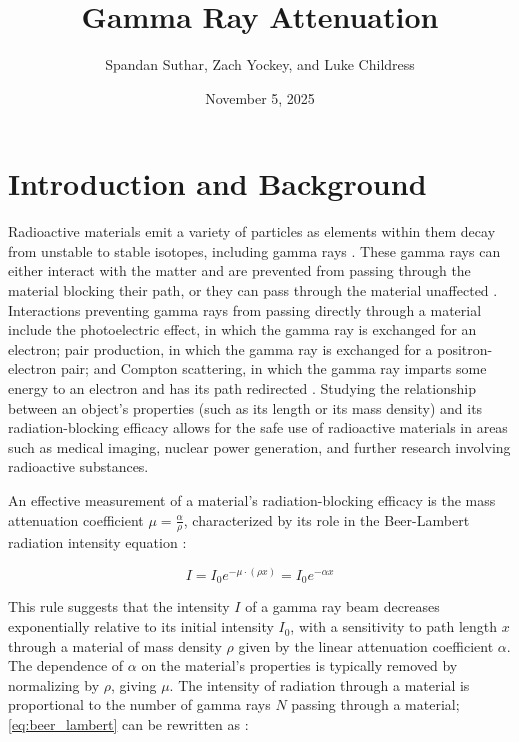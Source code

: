\documentclass[11pt]{article}
\title{Gamma Ray Attenuation}
\author{Spandan Suthar, Zach Yockey, and Luke Childress}
\date{November 5, 2025}
\begin{document}
\maketitle

\section{Introduction and Background}

Radioactive materials emit a variety of particles as elements within
them decay from unstable to stable isotopes, including gamma rays
\cite{nist-gen, young}. These
gamma rays can either interact with the matter and are prevented from passing
through the material blocking their path, or they can pass through the material
unaffected \cite{nist-gen}. Interactions preventing gamma rays from
passing directly
through a material include the photoelectric effect, in which the
gamma ray is exchanged
for an electron; pair production, in which the gamma ray is exchanged for a
positron-electron pair; and Compton scattering, in which the gamma
ray imparts some energy to an electron and has its path redirected
\cite{nist-gen}. Studying the relationship between an object's
properties (such as its length or its mass density) and its
radiation-blocking efficacy allows for the safe use of radioactive materials
in areas such as medical imaging, nuclear power generation, and
further research involving radioactive substances. \cite{young}

\vspace{1em}

An effective measurement of a material's radiation-blocking efficacy is the mass
attenuation coefficient $\mu = \frac{\alpha}{\rho}$, characterized
by its role in the
Beer-Lambert radiation
intensity equation \cite{nist-gen}:

\begin{equation}
  \label{eq:beer_lambert}
  I = I_0 e^{-\mu \cdot (\rho x)} = I_0 e^{-\alpha x}
\end{equation}

This rule suggests that the intensity $I$ of a gamma ray beam decreases
exponentially relative to its initial intensity $I_0$, with a sensitivity to
path length $x$ through a material of mass density $\rho$
given by the linear attenuation coefficient $\alpha$. The dependence of
$\alpha$ on the material's properties is typically removed by normalizing
by $\rho$, giving $\mu$. The intensity of radiation through a
material is proportional
to the number
of gamma rays $N$ passing through a material; \eqref{eq:beer_lambert} can
be rewritten as \cite{nist-gen, young}:
\end{document}
